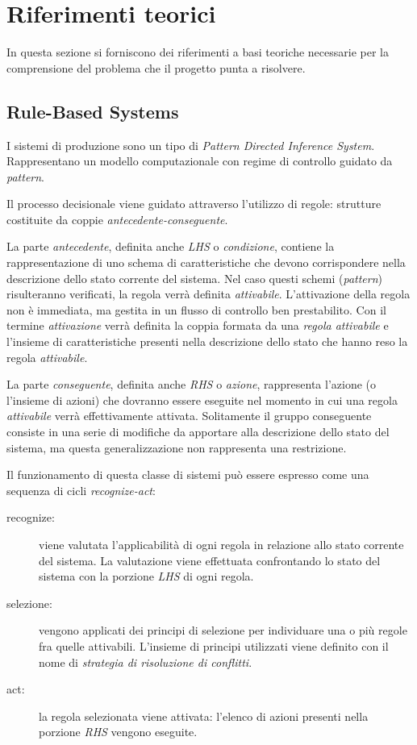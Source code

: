 \section{Riferimenti teorici}

In questa sezione si forniscono dei riferimenti a basi teoriche necessarie per la comprensione del problema che il progetto punta a risolvere.


\subsection{Rule-Based Systems}

I sistemi di produzione sono un tipo di \emph{Pattern Directed Inference System}. Rappresentano un modello computazionale con regime di controllo guidato da \emph{pattern}. 

Il processo decisionale viene guidato attraverso l'utilizzo di regole: strutture costituite da coppie \emph{antecedente-conseguente}.

La parte \emph{antecedente}, definita anche \emph{LHS} o \emph{condizione}, contiene la rappresentazione di uno schema di caratteristiche che devono corrispondere nella descrizione dello stato corrente del sistema. Nel caso questi schemi (\emph{pattern}) risulteranno verificati, la regola verrà definita \emph{attivabile}. L'attivazione della regola non è immediata, ma gestita in un flusso di controllo ben prestabilito. Con il termine \emph{attivazione} verrà definita la coppia formata da una \emph{regola attivabile} e l'insieme di caratteristiche presenti nella descrizione dello stato che hanno reso la regola \emph{attivabile}.

La parte \emph{conseguente}, definita anche \emph{RHS} o \emph{azione}, rappresenta l'azione (o l'insieme di azioni) che dovranno essere eseguite nel momento in cui una regola \emph{attivabile} verrà effettivamente attivata. Solitamente il gruppo conseguente consiste in una serie di modifiche da apportare alla descrizione dello stato del sistema, ma questa generalizzazione non rappresenta una restrizione.

Il funzionamento di questa classe di sistemi può essere espresso come una sequenza di cicli \emph{recognize-act}:
\begin{description}
	\item[recognize:] viene valutata l'applicabilità di ogni regola in relazione allo stato corrente del sistema. La valutazione viene effettuata confrontando lo stato del sistema con la porzione \emph{LHS} di ogni regola.
	\item[selezione:] vengono applicati dei principi di selezione per individuare una o più regole fra quelle attivabili. L'insieme di principi utilizzati viene definito con il nome di \emph{strategia di risoluzione di conflitti}.
	\item[act:] la regola selezionata viene attivata: l'elenco di azioni presenti nella porzione \emph{RHS} vengono eseguite.
\end{description}

